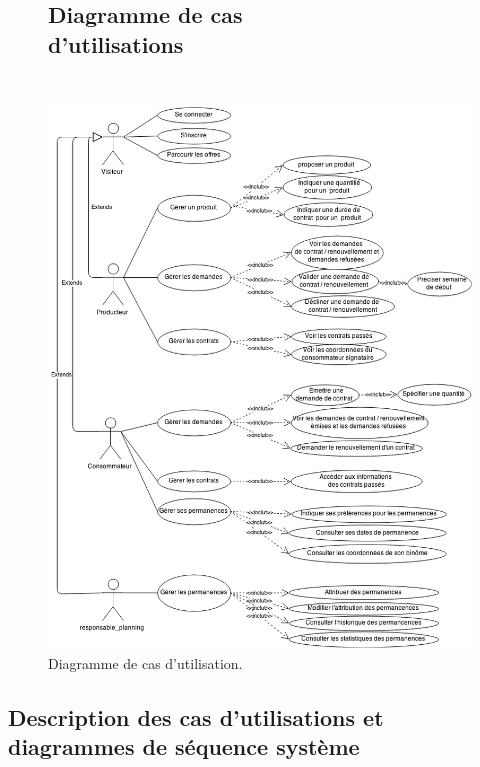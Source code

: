 \documentclass[12pt]{report}
\begin{document}
\begin{figure}[!h]
\centering
\subsection{Diagramme de cas d'utilisations~~~~~~~~~~~~~~~~~~~~~~~~~~~~~~~}
\includegraphics[height=1.35\textwidth]{./ressources/use_case.png}
\caption{Diagramme de cas d'utilisation.}
\end{figure}
\clearpage

\subsection{Description des cas d'utilisations et diagrammes de séquence système}
\clearpage
\end{document}
